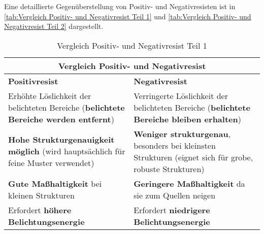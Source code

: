\documentclass{article} %
\begin{document}
\vspace{1em}

Eine detaillierte Gegenüberstellung von Positiv- und Negativresisten ist in \autoref{tab:Vergleich Positiv- und Negativresist Teil 1} und \autoref{tab:Vergleich Positiv- und Negativresist Teil 2} dargestellt.

\begin{table}[htb!]
    \centering
    \renewcommand{\arraystretch}{1.5} %
    \begin{tabular}{|p{6cm}|p{6cm}|}
        \hline
        \multicolumn{2}{|c|}{\textbf{Vergleich Positiv- und Negativresist}} \\ \hline
        \textbf{Positivresist} & \textbf{Negativresist} \\ \hline
        Erhöhte Löslichkeit der belichteten Bereiche (\textbf{belichtete Bereiche werden entfernt}) & Verringerte Löslichkeit der belichteten Bereiche (\textbf{belichtete Bereiche bleiben erhalten}) \\
        \textbf{Hohe Strukturgenauigkeit möglich} (wird hauptsächlich für feine Muster verwendet) & \textbf{Weniger strukturgenau}, besonders bei kleinsten Strukturen (eignet sich für grobe, robuste Strukturen) \\
        \textbf{Gute Maßhaltigkeit} bei kleinen Strukturen & \textbf{Geringere Maßhaltigkeit} da sie zum Quellen neigen \\
        Erfordert \textbf{höhere Belichtungsenergie} & Erfordert \textbf{niedrigere Belichtungsenergie} \\ \hline
    \end{tabular}
    \captionsetup{labelfont=bf} %
    \caption{Vergleich Positiv- und Negativresist Teil 1 \cite{madou2002, wolf2000}}
    \label{tab:Vergleich Positiv- und Negativresist Teil 1}
\end{table}
\end{document}
